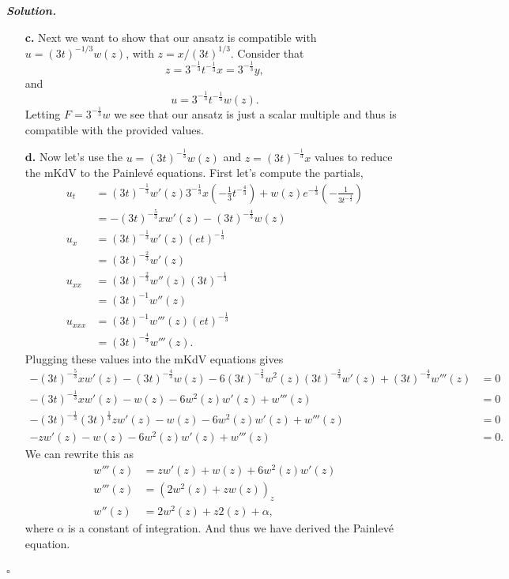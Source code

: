 \documentclass[12pt]{report}
\newenvironment{solution}[1][\it{Solution}]{\textbf{#1. } }{$\square$}
\begin{document}
\begin{solution}
\begin{enumerate}
        \item[{\bf c.}]
        Next we want to show that our ansatz is compatible with $u=(3t)^{-1/3}w(z)$, with $z=x/(3t)^{1/3}$. Consider that 
        \[
            z = 3^{-\frac{1}{3}}t^{-\frac{1}{3}}x = 3^{-\frac{1}{3}}y,
        \]
        and 
        \[
            u = 3^{-\frac{1}{3}}t^{-\frac{1}{3}}w(z).    
        \]
        Letting $F = 3^{-\frac{1}{3}}w$ we see that our ansatz is just a scalar multiple and thus is compatible with the provided values. 
    
        \item[{\bf d.}]
        Now let's use the $u = (3t)^{-\frac{1}{3}}w(z)$ and $z = (3t)^{-\frac{1}{3}}x$ values to reduce the mKdV to the Painlev\'e equations. First let's compute the partials,
        \begin{align*}
            u_t &= (3t)^{-\frac{1}{3}}w'(z) 3^{-\frac{1}{3}}x(-\frac{1}{3}t^{-\frac{4}{3}}) + w(z) e^{-\frac{1}{3}}(-\frac{1}{3t^{-\frac{4}{3}}})\\
            &= -(3t)^{-\frac{5}{3}}xw'(z) - (3t)^{-\frac{4}{3}}w(z)\\
            u_x &= (3t)^{-\frac{1}{3}}w'(z)(et)^{-\frac{1}{3}}\\
            &= (3t)^{-\frac{2}{3}}w'(z)\\
            u_{xx} &= (3t)^{-\frac{2}{3}}w''(z)(3t)^{-\frac{1}{3}}\\
            &= (3t)^{-1}w''(z)\\
            u_{xxx} &= (3t)^{-1}w'''(z)(et)^{-\frac{1}{3}}\\
            &=(3t)^{-\frac{4}{3}}w'''(z).
        \end{align*}
        Plugging these values into the mKdV equations gives
        \begin{align*}
            -(3t)^{-\frac{5}{3}}xw'(z) - (3t)^{-\frac{4}{3}}w(z) - 6(3t)^{-\frac{2}{3}}w^2(z)(3t)^{-\frac{2}{3}}w'(z) + (3t)^{-\frac{4}{3}}w'''(z) &= 0\\
            -(3t)^{-\frac{1}{3}}xw'(z) - w(z) - 6w^2(z)w'(z) + w'''(z) &= 0\\
            -(3t)^{-\frac{1}{3}}(3t)^{\frac{1}{3}} zw'(z) - w(z) - 6w^2(z)w'(z) + w'''(z) &= 0\\
            -zw'(z) - w(z) - 6w^2(z)w'(z) + w'''(z) &= 0.
        \end{align*}
        We can rewrite this as
        \begin{align*}
            w'''(z) &= zw'(z) + w(z) + 6w^2(z)w'(z)\\
            w'''(z) &= (2w^2(z) + zw(z))_z\\
            w''(z) &= 2w^2(z) + z2(z) + \alpha,
        \end{align*}
        where $\alpha$ is a constant of integration. And thus we have derived the Painlev\'e equation.
    \end{enumerate}
\end{solution}

\newpage
\end{document}
